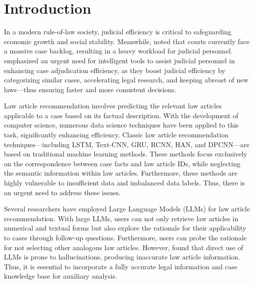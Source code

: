 \documentclass[review,times,nonatbib]{elsarticle} %
\renewcommand{\textcolor}[2]{#2}
\begin{document}

\section{Introduction}
In a modern rule-of-law society, \textcolor{blue}{judicial  efficiency} is \textcolor{blue}{critical to safeguarding} economic growth and social stability\cite{dakolias2014court, Kap2024JudicialEfficiency, fix-fierro2003courts}. Meanwhile, \textcite{xvguang2024supreme} \textcolor{blue}{noted that courts currently face a massive case backlog}, \textcolor{blue}{resulting in a heavy workload for judicial personnel}. \textcite{teck4judge} \textcolor{blue}{emphasized an urgent need for intelligent tools} to assist judicial personnel in \textcolor{blue}{enhancing case adjudication efficiency}, \textcolor{blue}{as they boost judicial efficiency by categorizing similar cases, accelerating legal research, and keeping abreast of new laws—thus ensuring faster and more consistent decisions}.

Law article recommendation \textcolor{blue}{involves} predicting the relevant law articles applicable to a case based on its factual description. With the \textcolor{blue}{development} of computer science, \textcolor{blue}{numerous} data science techniques have been applied to this task, \textcolor{blue}{significantly enhancing} efficiency. Classic law article recommendation techniques—\textcolor{blue}{including} LSTM\cite{hochreiter1997long}, Text-CNN\cite{kim2014convolutional}, GRU\cite{cho2014learning}, RCNN\cite{lai2015recurrent}, HAN\cite{yang2016hierarchical}, and DPCNN\cite{johnson2017deep}—are based on traditional machine learning methods. These methods focus \textcolor{blue}{exclusively} on the correspondence between case facts and law article \textcolor{blue}{IDs}, while \textcolor{blue}{neglecting the semantic information within} law articles. \textcolor{blue}{Furthermore}, these methods are highly \textcolor{blue}{vulnerable to} insufficient data and imbalanced data labels. \textcolor{blue}{Thus, there is an urgent need to address these issues}.

\textcolor{blue}{Several} researchers \textcolor{blue}{have employed} Large Language Models (LLMs) \textcolor{blue}{for} law article recommendation\cite{yang2024large,ma2024leveraging,shui2023comprehensive}. \textcolor{blue}{With} large LLMs, users can not only retrieve law articles in \textcolor{blue}{numerical} and textual \textcolor{blue}{forms} but also \textcolor{blue}{explore the rationale for their applicability to cases through} follow-up questions. \textcolor{blue}{Furthermore}, users \textcolor{blue}{can probe the rationale for not selecting} other analogous law articles. However, \textcite{dahl2024large} found that \textcolor{blue}{direct use of} LLMs is prone to hallucinations, \textcolor{blue}{producing inaccurate} law article information. \textcolor{blue}{Thus, it is essential to incorporate} a fully accurate legal information and case knowledge base for auxiliary analysis.
\end{document}
